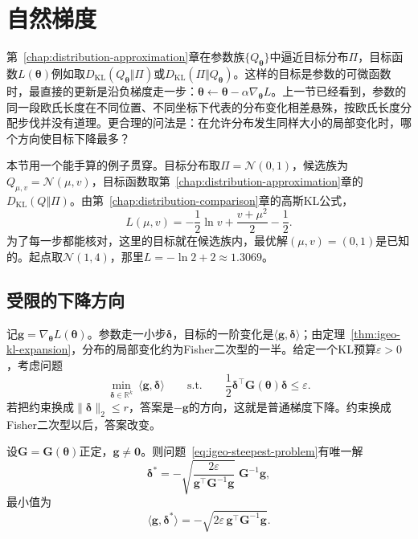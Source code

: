 \section{自然梯度}
\label{sec:igeo-natural-gradient}

第~\ref{chap:distribution-approximation}章在参数族$\{Q_{\bm{\theta}}\}$中逼近目标分布$\Pi$，目标函数$L(\bm{\theta})$例如取$D_{\mathrm{KL}}(Q_{\bm{\theta}}\Vert\Pi)$或$D_{\mathrm{KL}}(\Pi\Vert Q_{\bm{\theta}})$。这样的目标是参数的可微函数时，最直接的更新是沿负梯度走一步：$\bm{\theta}\leftarrow\bm{\theta}-\alpha\nabla_{\bm{\theta}}L$。上一节已经看到，参数的同一段欧氏长度在不同位置、不同坐标下代表的分布变化相差悬殊，按欧氏长度分配步伐并没有道理。更合理的问法是：在允许分布发生同样大小的局部变化时，哪个方向使目标下降最多？

本节用一个能手算的例子贯穿。目标分布取$\Pi=\mathcal{N}(0,1)$，候选族为$Q_{\mu,v}=\mathcal{N}(\mu,v)$，目标函数取第~\ref{chap:distribution-approximation}章的$D_{\mathrm{KL}}(Q\Vert\Pi)$。由第~\ref{chap:distribution-comparison}章的高斯KL公式，
\begin{equation}
  L(\mu,v)=-\frac12\ln v+\frac{v+\mu^{2}}{2}-\frac12 .
  \label{eq:igeo-running-objective}
\end{equation}
为了每一步都能核对，这里的目标就在候选族内，最优解$(\mu,v)=(0,1)$是已知的。起点取$\mathcal{N}(1,4)$，那里$L=-\ln2+2\approx1.3069$。

\subsection{受限的下降方向}
\label{sec:igeo-steepest}

记$\bm{g}=\nabla_{\bm{\theta}}L(\bm{\theta})$。参数走一小步$\bm{\delta}$，目标的一阶变化是$\langle\bm{g},\bm{\delta}\rangle$；由定理~\ref{thm:igeo-kl-expansion}，分布的局部变化约为Fisher二次型的一半。给定一个KL预算$\varepsilon>0$，考虑问题
\begin{equation}
  \min_{\bm{\delta}\in\mathbb{R}^{k}}\ \langle\bm{g},\bm{\delta}\rangle\qquad\text{s.t.}\qquad\frac12\bm{\delta}^{\top}\bm{G}(\bm{\theta})\bm{\delta}\leq\varepsilon .
  \label{eq:igeo-steepest-problem}
\end{equation}
若把约束换成$\lVert\bm{\delta}\rVert_2\leq r$，答案是$-\bm{g}$的方向，这就是普通梯度下降。约束换成Fisher二次型以后，答案改变。

\begin{theorem}[Fisher度量下的最速下降方向]
\label{thm:igeo-steepest}
设$\bm{G}=\bm{G}(\bm{\theta})$正定，$\bm{g}\neq\bm{0}$。则问题~\eqref{eq:igeo-steepest-problem}有唯一解
\begin{equation}
  \bm{\delta}^{*}=-\sqrt{\frac{2\varepsilon}{\bm{g}^{\top}\bm{G}^{-1}\bm{g}}}\;\bm{G}^{-1}\bm{g},
  \label{eq:igeo-steepest-solution}
\end{equation}
最小值为
\begin{equation}
  \langle\bm{g},\bm{\delta}^{*}\rangle=-\sqrt{2\varepsilon\,\bm{g}^{\top}\bm{G}^{-1}\bm{g}} .
  \label{eq:igeo-steepest-value}
\end{equation}
\end{theorem}


